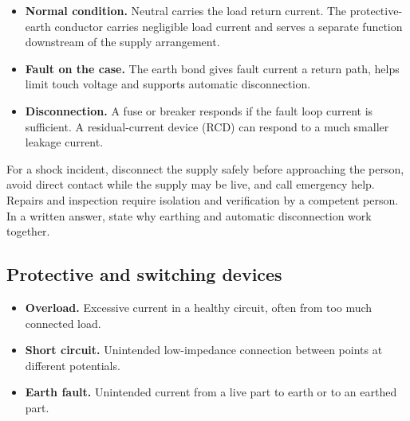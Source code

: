 \documentclass[12pt,a4paper]{article}
\begin{document}
\begin{itemize}[leftmargin=*, itemsep=3pt, topsep=4pt]
  \item \textbf{Normal condition.} Neutral carries the load return current. The protective-earth conductor carries negligible load current and serves a separate function downstream of the supply arrangement.
  \item \textbf{Fault on the case.} The earth bond gives fault current a return path, helps limit touch voltage and supports automatic disconnection.
  \item \textbf{Disconnection.} A fuse or breaker responds if the fault loop current is sufficient. A residual-current device (RCD) can respond to a much smaller leakage current.
\end{itemize}

\begin{tcolorbox}[tikzbox,title={Protective roles in a single-phase circuit},unbreakable]
\centering
{}
\end{tcolorbox}

For a shock incident, disconnect the supply safely before approaching the person, avoid direct contact while the supply may be live, and call emergency help. Repairs and inspection require isolation and verification by a competent person. In a written answer, state why earthing and automatic disconnection work together.

\subsection{Protective and switching devices}

\begin{itemize}[leftmargin=*, itemsep=3pt, topsep=4pt]
  \item \textbf{Overload.} Excessive current in a healthy circuit, often from too much connected load.
  \item \textbf{Short circuit.} Unintended low-impedance connection between points at different potentials.
  \item \textbf{Earth fault.} Unintended current from a live part to earth or to an earthed part.
\end{itemize}
\end{document}
